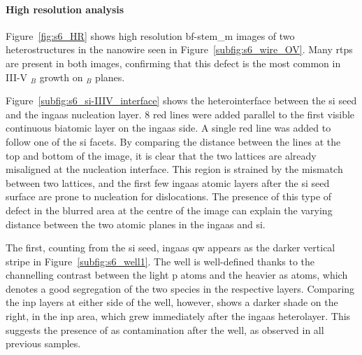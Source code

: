 \paragraph{High resolution analysis} Figure~\ref{fig:s6_HR} shows high resolution \acs{bf}-\acs{stem_m} images of two heterostructures in the nanowire seen in Figure~\ref{subfig:s6_wire_OV}. Many \acs{rtp}s are present in both images, confirming that this defect is the most common in III-V \(_B\) growth on \(_B\) planes. 

Figure~\ref{subfig:s6_si-IIIV_interface} shows the heterointerface between the \acl{si} seed and the \acs{ingaas} nucleation layer. \num{8} red lines were added parallel to the first visible continuous biatomic layer on the \acs{ingaas} side. A single red line was added to follow one of the \acs{si}  facets. By comparing the distance between the lines at the top and bottom of the image, it is clear that the two lattices are already misaligned at the nucleation interface. This region is strained by the mismatch between two lattices, and the first few \acs{ingaas} atomic layers after the \acs{si} seed surface are prone to nucleation for dislocations. The presence of this type of defect in the blurred area at the centre of the image can explain the varying distance between the two  atomic planes in the \acs{ingaas} and \acs{si}.

The first, counting from the \acs{si} seed, \acs{ingaas} \acl{qw} appears as the darker vertical stripe in Figure~\ref{subfig:s6_well1}. The well is well-defined thanks to the channelling contrast between the light \acl{p} atoms and the heavier \acs{as} atoms, which denotes a good segregation of the two species in the respective layers. Comparing the \acs{inp} layers at either side of the well, however, shows a darker shade on the right, in the \acs{inp} area, which grew immediately after the \acs{ingaas} heterolayer. This suggests the presence of \acl{as} contamination after the well, as observed in all previous samples.
\par

